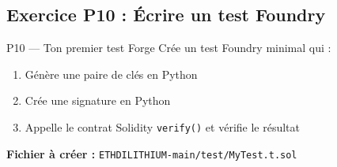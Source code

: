 \documentclass[12pt, a4paper]{article}
\begin{document}
\subsection{Exercice P10 : Écrire un test Foundry}

\begin{exercice}{P10 --- Ton premier test Forge}
Crée un test Foundry minimal qui :
\begin{enumerate}
  \item Génère une paire de clés en Python
  \item Crée une signature en Python
  \item Appelle le contrat Solidity \texttt{verify()} et vérifie le résultat
\end{enumerate}

\textbf{Fichier à créer :} \texttt{ETHDILITHIUM-main/test/MyTest.t.sol}
\end{exercice}
\end{document}
